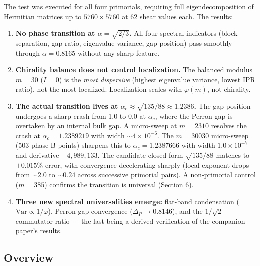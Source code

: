\documentclass[11pt,letterpaper]{article}
\theoremstyle{definition}
\theoremstyle{remark}
\begin{document}
The test was executed for all four primorials, requiring full eigendecomposition of Hermitian matrices up to $5760 \times 5760$ at 62 shear values each. The results:

\begin{enumerate}
\item
  \textbf{No phase transition at $\alpha = \sqrt{2/3}$.} All four spectral indicators (block separation, gap ratio, eigenvalue variance, gap position) pass smoothly through $\alpha = 0.8165$ without any sharp feature.
\item
  \textbf{Chirality balance does not control localization.} The balanced modulus $m = 30$ ($I = 0$) is the \emph{most dispersive} (highest eigenvalue variance, lowest IPR ratio), not the most localized. Localization scales with $\varphi(m)$, not chirality.
\item
  \textbf{The actual transition lives at $\alpha_c \approx \sqrt{135/88} \approx 1.2386$.} The gap position undergoes a sharp crash from 1.0 to 0.0 at $\alpha_c$, where the Perron gap is overtaken by an internal bulk gap. A micro-sweep at $m = 2310$ resolves the crash at $\alpha_c = 1.2389219$ with width $\sim 4 \times 10^{-6}$. The $m = 30030$ micro-sweep (503 phase-B points) sharpens this to $\alpha_c = 1.2387666$ with width $1.0 \times 10^{-7}$ and derivative $-4{,}989{,}133$. The candidate closed form $\sqrt{135/88}$ matches to $+0.015\%$ error, with convergence decelerating sharply (local exponent drops from $\sim 2.0$ to $\sim 0.24$ across successive primorial pairs). A non-primorial control ($m = 385$) confirms the transition is universal (Section 6).
\item
  \textbf{Three new spectral universalities emerge:} flat-band condensation ($\text{Var} \propto 1/\varphi$), Perron gap convergence ($\Delta_P \to 0.8146$), and the $1/\sqrt{2}$ commutator ratio --- the last being a derived verification of the companion paper's results.
\end{enumerate}

\subsection{Overview}\label{overview}
\end{document}
